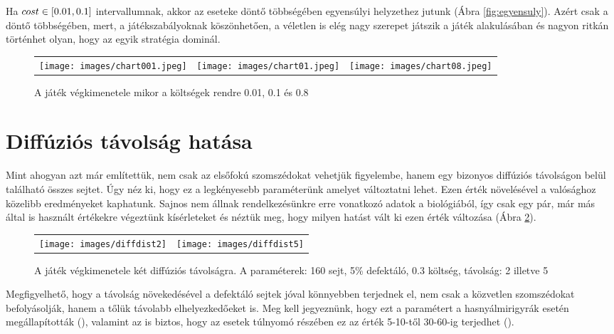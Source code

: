 Ha $cost \in\interval{0.01}{0.1}$ intervallumnak, akkor az eseteke döntő többségében egyensúlyi helyzethez jutunk (Ábra \ref{fig:egyensuly}). Azért csak a döntő többségében, mert, a játékszabályoknak köszönhetően, a véletlen is elég nagy szerepet játszik a játék alakulásában és nagyon ritkán történhet olyan, hogy az egyik stratégia dominál.

\begin{figure}[ht!]
	\centering
	\begin{tabular}{ccc}
		\texttt{[image: images/chart001.jpeg]}
		&
		\texttt{[image: images/chart01.jpeg]}
		&
		\texttt{[image: images/chart08.jpeg]}
	\end{tabular}
	\caption{A játék végkimenetele mikor a költségek rendre 0.01, 0.1 és 0.8}
	\label{fig:CoopCostChange}
\end{figure}


\section{Diffúziós távolság hatása}

Mint ahogyan azt már említettük, nem csak az elsőfokú szomszédokat vehetjük figyelembe, hanem egy bizonyos diffúziós távolságon belül található összes sejtet. Úgy néz ki, hogy ez a legkényesebb paraméterünk amelyet változtatni lehet. Ezen érték növelésével a valósághoz közelibb eredményeket kaphatunk. Sajnos nem állnak rendelkezésünkre erre vonatkozó adatok a biológiából, így csak egy pár, már más által is használt értékekre végeztünk kísérleteket és néztük meg, hogy milyen hatást vált ki ezen érték változása (Ábra \ref{fig:DiffDist}). 

\begin{figure}[ht!]
	\centering
	\captionsetup{justification=centering}
	\begin{tabular}{cc}
		\texttt{[image: images/diffdist2]}
		&
		\texttt{[image: images/diffdist5]}
	\end{tabular}
	\caption{A játék végkimenetele két diffúziós távolságra. A paraméterek: 160 sejt, 5\% defektáló, 0.3 költség, távolság: 2 illetve 5}
	\label{fig:DiffDist}
\end{figure}

Megfigyelhető, hogy a távolság növekedésével a defektáló sejtek jóval könnyebben terjednek el, nem csak a közvetlen szomszédokat befolyásolják, hanem a tőlük távolabb elhelyezkedőeket is. Meg kell jegyeznünk, hogy ezt a paramétert a hasnyálmirigyrák esetén megállapították (\cite{archetti2015heterogeneity}), valamint az is biztos, hogy az esetek túlnyomó részében ez az érték 5-10-től 30-60-ig terjedhet (\cite{archetti2016cooperation}).

